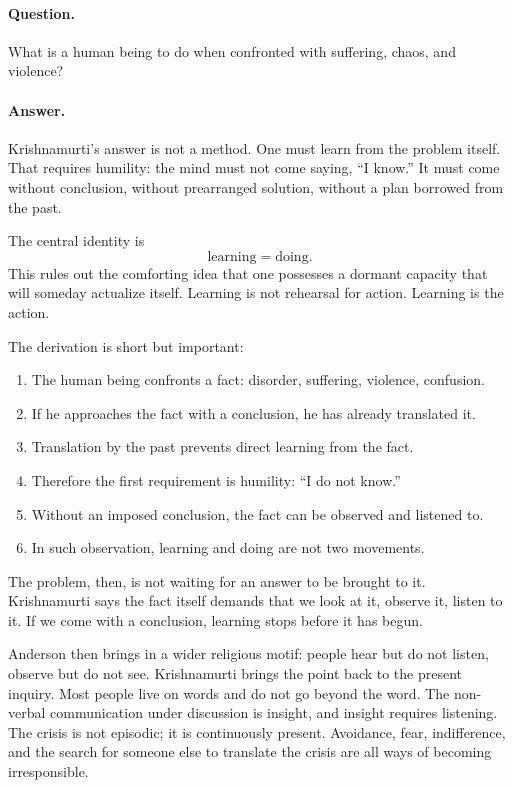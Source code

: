 \paragraph{Question.}
What is a human being to do when confronted with suffering, chaos, and violence?

\paragraph{Answer.}
Krishnamurti's answer is not a method. One must learn from the problem itself. That requires humility: the mind must not come saying, ``I know.'' It must come without conclusion, without prearranged solution, without a plan borrowed from the past.

The central identity is
\begin{equation}
\text{learning} = \text{doing}.
\end{equation}
This rules out the comforting idea that one possesses a dormant capacity that will someday actualize itself. Learning is not rehearsal for action. Learning is the action.

The derivation is short but important:
\begin{enumerate}
\item The human being confronts a fact: disorder, suffering, violence, confusion.
\item If he approaches the fact with a conclusion, he has already translated it.
\item Translation by the past prevents direct learning from the fact.
\item Therefore the first requirement is humility: ``I do not know.''
\item Without an imposed conclusion, the fact can be observed and listened to.
\item In such observation, learning and doing are not two movements.
\end{enumerate}

The problem, then, is not waiting for an answer to be brought to it. Krishnamurti says the fact itself demands that we look at it, observe it, listen to it. If we come with a conclusion, learning stops before it has begun.

Anderson then brings in a wider religious motif: people hear but do not listen, observe but do not see. Krishnamurti brings the point back to the present inquiry. Most people live on words and do not go beyond the word. The non-verbal communication under discussion is insight, and insight requires listening. The crisis is not episodic; it is continuously present. Avoidance, fear, indifference, and the search for someone else to translate the crisis are all ways of becoming irresponsible.

